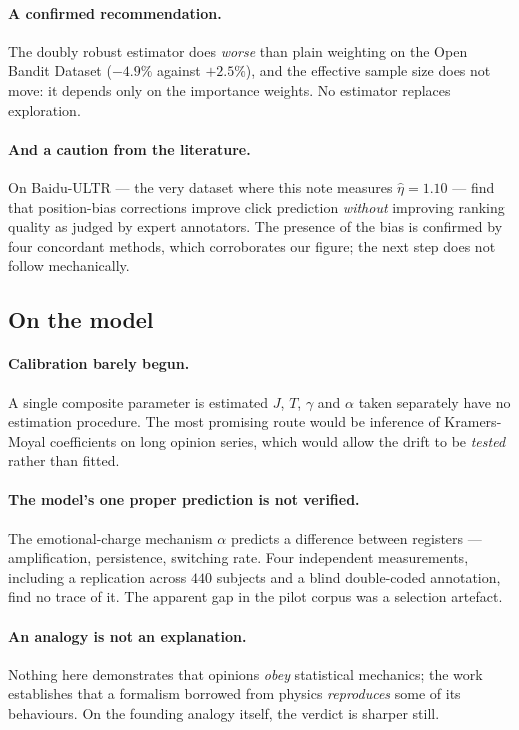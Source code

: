 \documentclass[11pt,a4paper]{article}
\begin{document}
\paragraph{A confirmed recommendation.} The doubly robust estimator does \emph{worse} than plain
weighting on the Open Bandit Dataset ($-4.9\%$ against $+2.5\%$), and the effective sample size
does not move: it depends only on the importance weights. No estimator replaces exploration.

\paragraph{And a caution from the literature.} On Baidu-ULTR --- the very dataset where this note
measures $\hat\eta = 1.10$ --- \citet{hager2024} find that position-bias corrections improve click
prediction \emph{without} improving ranking quality as judged by expert annotators. The presence
of the bias is confirmed by four concordant methods, which corroborates our figure; the next step
does not follow mechanically.

\subsection{On the model}

\paragraph{Calibration barely begun.} A single composite parameter is estimated
$J$, $T$, $\gamma$ and $\alpha$ taken separately have no estimation
procedure. The most promising route would be inference of Kramers-Moyal coefficients on long
opinion series, which would allow the drift to be \emph{tested} rather than fitted.

\paragraph{The model's one proper prediction is not verified.} The emotional-charge mechanism
$\alpha$ predicts a difference between registers --- amplification, persistence, switching rate.
Four independent measurements, including a replication across $440$ subjects and a blind
double-coded annotation, find no trace of it. The apparent gap in the pilot corpus was a
selection artefact.

\paragraph{An analogy is not an explanation.} Nothing here demonstrates that opinions
\emph{obey} statistical mechanics; the work establishes that a formalism borrowed from physics
\emph{reproduces} some of its behaviours. On the founding analogy itself, the verdict is
sharper still.
\end{document}

